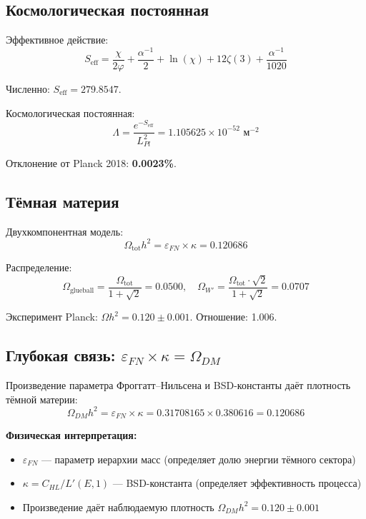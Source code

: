 \documentclass[12pt,a4paper,twoside]{article}
\newcommand{\EPS}{\varepsilon}
\theoremstyle{definition}
\begin{document}
\subsection{Космологическая постоянная}

Эффективное действие:
\begin{equation}
S_{\text{eff}} = \frac{\chi}{2\varphi} + \frac{\alpha^{-1}}{2} + \ln(\chi) + 12\zeta(3) + \frac{\alpha^{-1}}{1020}
\label{eq:seff}
\end{equation}

Численно: $S_{\text{eff}} = 279.8547$.

Космологическая постоянная:
\begin{equation}
\Lambda = \frac{e^{-S_{\text{eff}}}}{L_{Pl}^2} = 1.105625 \times 10^{-52} \text{ м}^{-2}
\label{eq:lambda}
\end{equation}

Отклонение от Planck 2018: \textbf{0.0023\%}.

\subsection{Тёмная материя}

Двухкомпонентная модель:
\begin{equation}
\Omega_{\text{tot}} h^2 = \EPS_{FN} \times \kappa = 0.120686
\label{eq:dm}
\end{equation}

Распределение:
\begin{equation}
\Omega_{\text{glueball}} = \frac{\Omega_{\text{tot}}}{1 + \sqrt{2}} = 0.0500, \quad
\Omega_{W'} = \frac{\Omega_{\text{tot}} \cdot \sqrt{2}}{1 + \sqrt{2}} = 0.0707
\label{eq:dm_split}
\end{equation}

Эксперимент Planck: $\Omega h^2 = 0.120 \pm 0.001$. Отношение: 1.006.

\subsection{Глубокая связь: $\EPS_{FN} \times \kappa = \Omega_{DM}$}
\label{sec:deep_connection}

Произведение параметра Фроггатт--Нильсена и BSD-константы даёт плотность тёмной материи:
\begin{equation}
\Omega_{DM} h^2 = \EPS_{FN} \times \kappa = 0.31708165 \times 0.380616 = 0.120686
\label{eq:deep_connection2}
\end{equation}

\textbf{Физическая интерпретация:}
\begin{itemize}
    \item $\EPS_{FN}$ — параметр иерархии масс (определяет долю энергии тёмного сектора)
    \item $\kappa = C_{HL}/L'(E,1)$ — BSD-константа (определяет эффективность процесса)
    \item Произведение даёт наблюдаемую плотность $\Omega_{DM} h^2 = 0.120 \pm 0.001$
\end{itemize}
\end{document}
